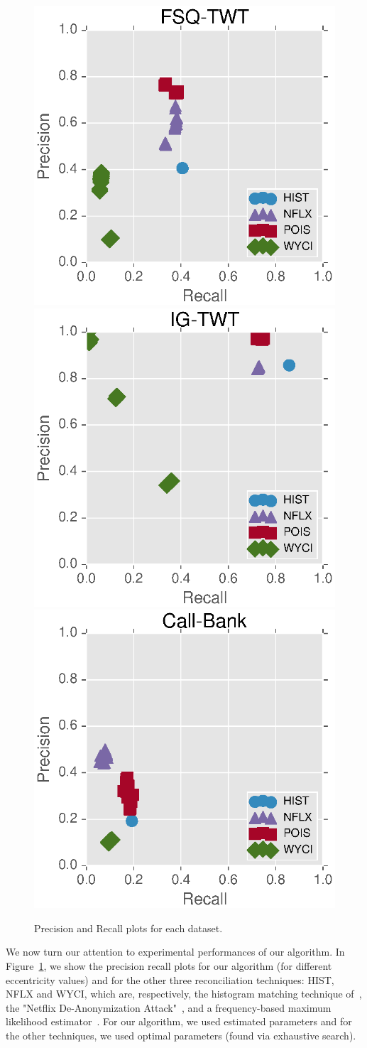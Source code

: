 \begin{figure}[th!]
  \centering
  \hspace{-0.7cm}
  \includegraphics[width=0.35\linewidth]{fig/fs_scatter.eps}
  \hspace{-0.7cm}
  \includegraphics[width=0.35\linewidth]{fig/ig_scatter.eps}
  \hspace{-0.7cm}
  \includegraphics[width=0.35\linewidth]{fig/gd_scatter.eps}
  \caption{Precision and Recall plots for each dataset.}
  \vspace{1ex}
  \label{fig:link-prec-recall}
\end{figure}

We now turn our attention to experimental performances of our algorithm. 
In Figure~\ref{fig:link-prec-recall}, we show the precision recall plots for our algorithm (for different eccentricity values) and for the other three reconciliation techniques: HIST, NFLX and WYCI, which are, respectively,
the histogram matching technique of~\cite{Unnikrishnan:2013fc},
the "Netflix De-Anonymization Attack"~\cite{Narayanan:2008iu},
and a frequency-based maximum likelihood estimator~\cite{Rossi:2014eh}. 
For our algorithm, we used estimated parameters and for the other techniques, we used optimal parameters (found via exhaustive search).

